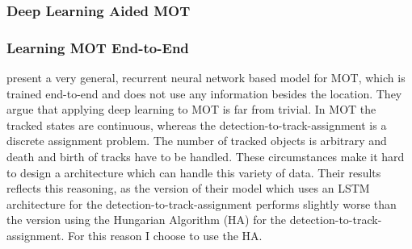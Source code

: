 \documentclass[12pt,a4paper]{article}
\begin{document}
\subsubsection{Deep Learning Aided MOT}
\label{dl_aided_mot}



\subsubsection{Learning MOT End-to-End}

\cite{milan_rnn_tracking} present a very general, recurrent neural network based model for MOT, which is trained end-to-end and does not use any information besides the location. They argue that applying deep learning to MOT is far from trivial. In MOT the tracked states are continuous, whereas the detection-to-track-assignment is a discrete assignment problem. The number of tracked objects is arbitrary and death and birth of tracks have to be handled. These circumstances make it hard to design a architecture which can handle this variety of data. Their results reflects this reasoning, as the version of their model which uses an LSTM architecture for the detection-to-track-assignment performs slightly worse than the version using the Hungarian Algorithm (HA) for the detection-to-track-assignment. For this reason I choose to use the HA.
\end{document}
